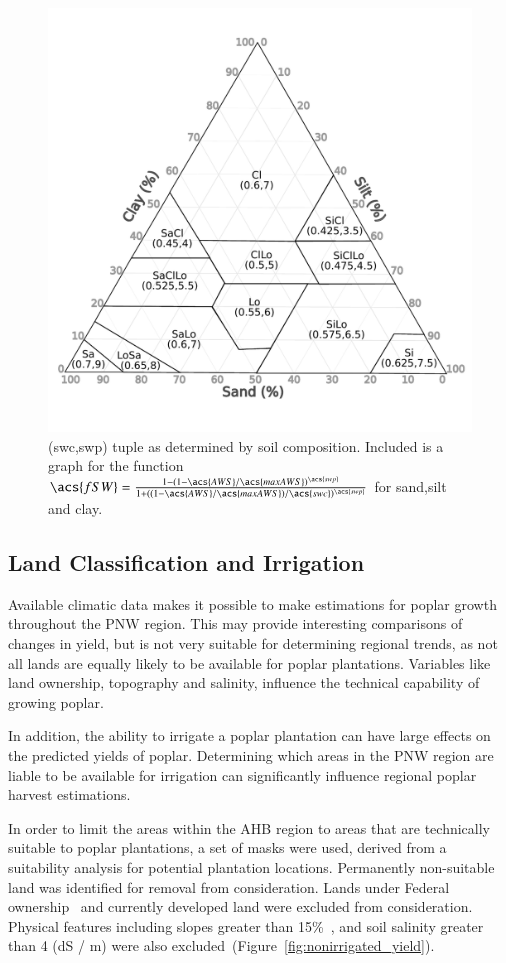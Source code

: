 \documentclass[preprint,12pt]{elsarticle}
\begin{document}
\begin{figure}
  \centering
  \includegraphics[width=0.52\linewidth]{soil_triangle}
  
  \caption{(\acs{swc},\acs{swp}) tuple as determined by soil
    composition.  Included is a graph for the function $\acs{fSW} =
    \frac{1-(1-\acs{AWS}/\acs{maxAWS})^{\acs{swp}}}{1+((1-\acs{AWS}/\acs{maxAWS})/\acs{swc})^{\acs{swp}}}$
    for sand,silt and clay. }
  \label{fig:soil-triangle}
\end{figure}

\subsection{Land Classification and Irrigation}
\label{sec:land}

Available climatic data makes it possible to make estimations for
poplar growth throughout the \ac{PNW} region.  This may provide
interesting comparisons of changes in yield, but is not very suitable
for determining regional trends, as not all lands are equally likely
to be available for poplar plantations.  Variables like land
ownership, topography and salinity, influence the technical capability
of growing poplar.  

In addition, the ability to irrigate a poplar plantation can have
large effects on the predicted yields of poplar.  Determining which
areas in the \ac{PNW} region are liable to be available for irrigation
can significantly influence regional poplar harvest estimations.  

In order to limit the areas within the \ac{AHB} region to areas that
are technically suitable to poplar plantations, a set of masks were
used, derived from a suitability analysis for potential plantation
locations. Permanently non-suitable land was
identified for removal from consideration. Lands under Federal
ownership~\cite{NationalAtlasoftheUnitedStates2013} and currently
developed land were excluded from consideration.
Physical features including slopes greater than 15\%~\cite{Gesch2007},
and soil salinity greater than 4 (dS / m) were also
excluded~(Figure~\ref{fig:nonirrigated_yield}).
\end{document}
